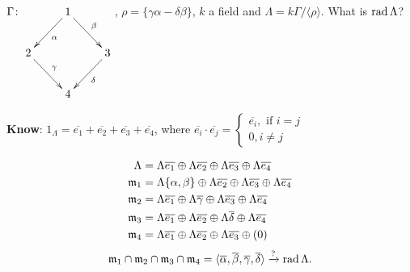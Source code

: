 \begin{exam}
$\Gamma\colon \xymatrix{ & 1\ar[dl]^\alpha\ar[dr]^\beta & \\
2\ar[dr]^\gamma & & 3\ar[dl]^\delta \\
& 4 & 
}$, $\rho=\{\gamma\alpha - \delta\beta\}$, $k$ a field and $\Lambda =
k\Gamma/\langle \rho\rangle$.  What is $\operatorname{rad}\nolimits\Lambda$?

\textbf{Know}: $1_\Lambda = \overline{e_1} + \overline{e_2} +
\overline{e_3} + \overline{e_4}$, where
$\overline{e_i}\cdot\overline{e_j} = \begin{cases} \overline{e_i},
  \text{\ if $i = j$}\\
0, i\neq j
\end{cases}$

\begin{exer}
\begin{align}
\Lambda & = \Lambda\overline{e_1} \oplus \Lambda\overline{e_2} \oplus \Lambda\overline{e_3} \oplus \Lambda\overline{e_4}\notag\\
\mathfrak{m}_1 & = \Lambda\{\alpha,\beta\} \oplus \Lambda\overline{e_2} \oplus \Lambda\overline{e_3} \oplus \Lambda\overline{e_4}\notag\\
\mathfrak{m}_2 & = \Lambda\overline{e_1} \oplus \Lambda\overline{\gamma} \oplus \Lambda\overline{e_3} \oplus \Lambda\overline{e_4}\notag\\
\mathfrak{m}_3 & = \Lambda\overline{e_1} \oplus \Lambda\overline{e_2}  \oplus \Lambda\overline{\delta} \oplus \Lambda\overline{e_4}\notag\\
\mathfrak{m}_4 & = \Lambda\overline{e_1} \oplus \Lambda\overline{e_2} \oplus \Lambda\overline{e_3} \oplus (0)\notag\\
\end{align}
\[\mathfrak{m}_1 \cap \mathfrak{m}_2 \cap \mathfrak{m}_3 \cap
  \mathfrak{m}_4 = \langle
  \overline{\alpha},\overline{\beta},\overline{\gamma},\overline{\delta}\rangle
  \xrightarrow{\text{?}} \operatorname{rad}\nolimits\Lambda.\]
\end{exer}
\end{exam}

